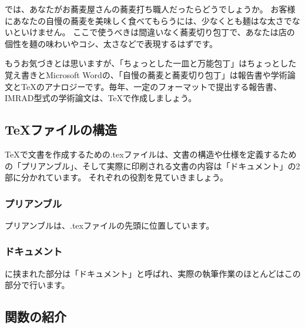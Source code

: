 \documentclass[TeXworkshop]{subfiles}
\begin{document}
では、あなたがお蕎麦屋さんの蕎麦打ち職人だったらどうでしょうか。
お客様にあなたの自慢の蕎麦を美味しく食べてもらうには、少なくとも麺はな太さでないといけません。
ここで使うべきは間違いなく蕎麦切り包丁で、あなたは店の個性を麺の味わいやコシ、太さなどで表現するはずです。

もうお気づきとは思いますが、「ちょっとした一皿と万能包丁」はちょっとした覚え書きとMicrosoft Wordの、「自慢の蕎麦と蕎麦切り包丁」は報告書や学術論文と\TeX のアナロジーです。毎年、一定のフォーマットで提出する報告書、IMRAD型式の学術論文は、\TeX で作成しましょう。

\subsection{\TeX ファイルの構造}
\TeX で文書を作成するための.texファイルは、文書の構造や仕様を定義するための「プリアンブル」、そして実際に印刷される文書の内容は「ドキュメント」の2部に分かれています。
それぞれの役割を見ていきましょう。

\subsubsection{プリアンブル}
プリアンブルは、.texファイルの先頭に位置しています。
\subsubsection{ドキュメント}
に挟まれた部分は「ドキュメント」と呼ばれ、実際の執筆作業のほとんどはこの部分で行います。
\subsection{関数の紹介}
\end{document}
